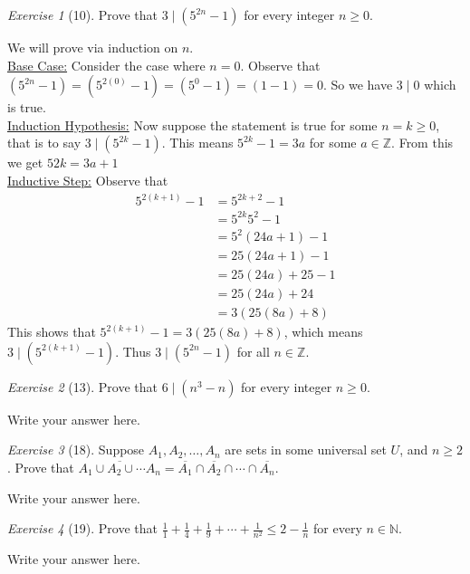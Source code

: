 \documentclass[12pt]{amsart}
\makeatletter
\theoremstyle{remark}
\newtheorem*{exercise}{Exercise}%
\def\NN{\ensuremath{\mathbb N}}
\def\ZZ{\ensuremath{\mathbb Z}}
\renewenvironment{proof}[1][\proofname]{\par\doublespacing
  \pushQED{\qed}%
  \normalfont \topsep6\p@\@plus6\p@\relax
  \list{}{%
    \settowidth{\leftmargin}{\itshape\proofname:\hskip\labelsep}%
    \setlength{\labelwidth}{0pt}%
    \setlength{\itemindent}{-\leftmargin}%
  }%
  \item[\hskip\labelsep\itshape#1\@addpunct{:}]\ignorespaces
}{%
  \popQED\endlist\@endpefalse
  \singlespacing
}
\theoremstyle{mycomment}
\makeatother
\begin{document}
\begin{exercise}[10] Prove that $3\mid(5^{2n}-1)$ for every integer $n\ge 0$.
\begin{proof}
  We will prove via induction on $n$. \\
  \underline{Base Case:} Consider the case where $n=0$. Observe that $(5^{2n} -1) = (5^{2(0)} - 1) =( 5^0 - 1) =( 1 - 1) = 0$. So we have $3 \mid 0$ which is true.  \\
  \underline{Induction Hypothesis:} Now suppose the statement is true for some $n = k \geq 0$, that is to say $ 3 \mid (5^{2k} - 1)$. This means $5^{2k} - 1 = 3a  $ for some $a \in \ZZ$. From this we get $5{2k} = 3a + 1$ \\
  \underline{Inductive Step:} Observe that
  \begin{align*}
    5^{2(k+1)}-1 &= 5^{2k+2} - 1 \\
                 &= 5^{2k}5^{2} - 1 \\
                 &= 5^2(24a + 1) - 1 \\
                 &= 25(24a + 1) - 1 \\
                 &= 25(24a) + 25 - 1 \\
                 &= 25(24a) + 24 \\
                 &= 3(25(8a) + 8)
  \end{align*}
  This shows that $5^{2(k+1)} - 1 = 3(25(8a) + 8)$, which means $3 \mid (5^{2(k+1)} - 1)$. Thus $3 \mid (5^{2n} - 1)$ for all $n \in \ZZ$.
\end{proof}
\end{exercise}

\begin{exercise}[13] Prove that $6\mid(n^{3}-n)$ for every integer $n\ge 0$.
\begin{proof}
Write your answer here.
\end{proof}
\end{exercise}

\begin{exercise}[18] Suppose $A_{1},A_{2},\ldots, A_{n}$ are sets in some universal set $U$, and $n\ge 2$. Prove that $\overline{A_{1}\cup A_{2}\cup \cdots A_{n}}=\overline{A_{1}}\cap\overline{A_{2}}\cap\cdots \cap\overline{A_{n}}$.
\begin{proof}
Write your answer here.
\end{proof}
\end{exercise}

\begin{exercise}[19] Prove that $\displaystyle \frac{1}{1}+\frac{1}{4}+\frac{1}{9}+\cdots+\frac{1}{n^{2}}\le 2-\frac{1}{n}$ for every $n\in\NN$.
\begin{proof}
Write your answer here.
\end{proof}
\end{exercise}
\end{document}

